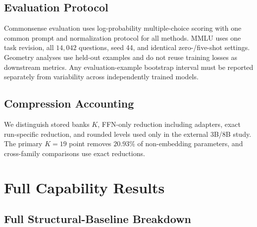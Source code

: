 \documentclass{article}
\theoremstyle{plain}
\theoremstyle{definition}
\theoremstyle{remark}
\begin{document}
\subsection{Evaluation Protocol}

Commonsense evaluation uses log-probability multiple-choice scoring with one common
prompt and normalization protocol for all methods.  MMLU uses one task revision,
all $14{,}042$ questions, seed 44, and identical zero-/five-shot settings.  Geometry analyses use held-out examples and do not reuse training losses as
downstream metrics.  Any evaluation-example bootstrap interval must be reported
separately from variability across independently trained models.

\subsection{Compression Accounting}

We distinguish stored banks $K$, FFN-only reduction including adapters, exact
run-specific reduction, and rounded levels used only in the external 3B/8B study.
The primary $K=19$ point removes $20.93\%$ of non-embedding parameters, and
cross-family comparisons use exact reductions.

\clearpage
\section{Full Capability Results}
\label{app:additional-results}

\subsection{Full Structural-Baseline Breakdown}
\end{document}
